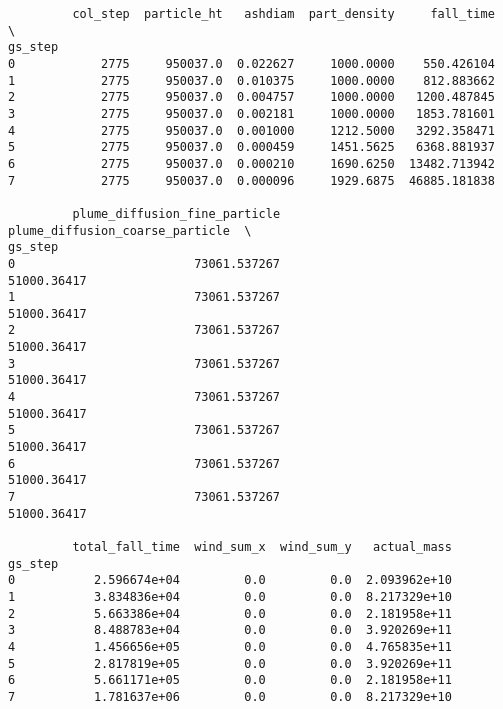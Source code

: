 \documentclass[11pt]{article}
\begin{document}
    
    \begin{verbatim}
         col_step  particle_ht   ashdiam  part_density     fall_time  \
gs_step                                                                
0            2775     950037.0  0.022627     1000.0000    550.426104   
1            2775     950037.0  0.010375     1000.0000    812.883662   
2            2775     950037.0  0.004757     1000.0000   1200.487845   
3            2775     950037.0  0.002181     1000.0000   1853.781601   
4            2775     950037.0  0.001000     1212.5000   3292.358471   
5            2775     950037.0  0.000459     1451.5625   6368.881937   
6            2775     950037.0  0.000210     1690.6250  13482.713942   
7            2775     950037.0  0.000096     1929.6875  46885.181838   

         plume_diffusion_fine_particle  plume_diffusion_coarse_particle  \
gs_step                                                                   
0                         73061.537267                      51000.36417   
1                         73061.537267                      51000.36417   
2                         73061.537267                      51000.36417   
3                         73061.537267                      51000.36417   
4                         73061.537267                      51000.36417   
5                         73061.537267                      51000.36417   
6                         73061.537267                      51000.36417   
7                         73061.537267                      51000.36417   

         total_fall_time  wind_sum_x  wind_sum_y   actual_mass  
gs_step                                                         
0           2.596674e+04         0.0         0.0  2.093962e+10  
1           3.834836e+04         0.0         0.0  8.217329e+10  
2           5.663386e+04         0.0         0.0  2.181958e+11  
3           8.488783e+04         0.0         0.0  3.920269e+11  
4           1.456656e+05         0.0         0.0  4.765835e+11  
5           2.817819e+05         0.0         0.0  3.920269e+11  
6           5.661171e+05         0.0         0.0  2.181958e+11  
7           1.781637e+06         0.0         0.0  8.217329e+10  
    \end{verbatim}

    
    \begin{center}
    \end{center}
    { \hspace*{\fill} \\}
    
\end{document}

